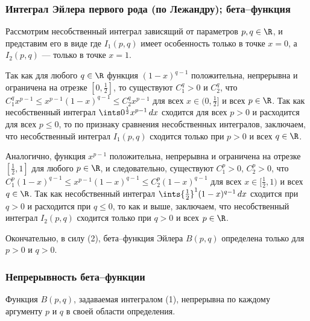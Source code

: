 \documentclass[a4paper]{article}
\begin{document}
\subsubsection{Интеграл Эйлера первого рода (по Лежандру);
бета--функция}

Рассмотрим несобственный интеграл  зависящий от параметров $p,q\in\R$, и представим
его в виде  где $I_1(p,q)$ имеет особенность только в
точке $x=0$, а $I_2(p,q)$ --- только в точке $x=1$.

Так как для любого $q\in\R$ функция $(1-x)^{q-1}$ положительна,
непрерывна и ограничена на отрезке $[0,\frac12]$, то существуют
$C_1^q>0$ и $C_2^q$, что $C_1^q x^{p-1} \le x^{p-1} (1-x)^{q-1} \le
C_2^q x^{p-1}$ для всех $x\in(0,\frac12]$ и всех $p\in\R$. Так как
несобственный интеграл $\ints0^{\frac12} x^{p-1}\,dx$ сходится для
всех $p>0$ и расходится для всех $p\le0$, то по признаку сравнения
несобственных интегралов, заключаем, что несобственный интеграл
$I_1(p,q)$ сходится только при $p>0$ и всех $q\in\R$.

Аналогично, функция $x^{p-1}$ положительна, непрерывна и ограничена
на отрезке $[\frac12,1]$ для любого $p\in\R$, и следовательно,
существуют $C_1^p>0$, $C_2^p>0$, что $C_1^p(1-x)^{q-1}\le x^{p-1}
(1-x)^{q-1} \le C_2^p (1-x)^{q-1}$ для всех $x\in[\frac12,1)$ и всех
$q\in\R$. Так как несобственный интеграл $\ints{\frac12}^1
(1-x)^{q-1}\,dx$ сходится при $q>0$ и расходится при $q\le0$, то как
и выше, заключаем, что несобственный интеграл $I_2(p,q)$ сходится
только при $q>0$ и всех $p\in\R$.

Окончательно, в силу (2), бета--функция Эйлера $B(p,q)$ определена
только для $p>0$ и $q>0$.

\subsubsection{Непрерывность бета--функции}

\begin{theorem}
Функция $B(p,q)$, задаваемая интегралом (1), непрерывна по каждому
аргументу $p$ и $q$ в своей области определения.
\end{theorem}
\end{document}

